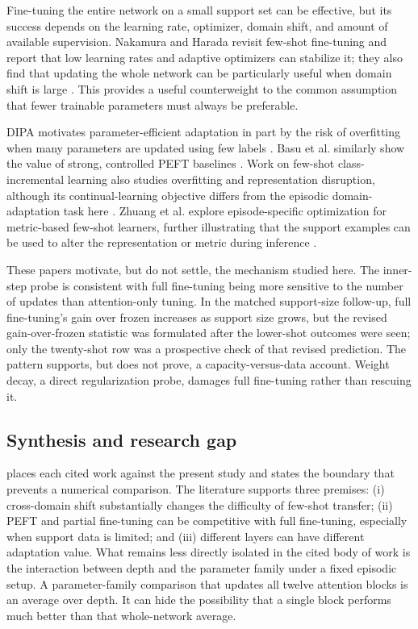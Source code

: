 \documentclass[11pt]{article}
\begin{document}
Fine-tuning the entire network on a small support set can be effective, but its success depends on the learning rate, optimizer, domain shift, and amount of available supervision. Nakamura and Harada revisit few-shot fine-tuning and report that low learning rates and adaptive optimizers can stabilize it; they also find that updating the whole network can be particularly useful when domain shift is large \cite{nakamura2019}. This provides a useful counterweight to the common assumption that fewer trainable parameters must always be preferable.

DIPA motivates parameter-efficient adaptation in part by the risk of overfitting when many parameters are updated using few labels \cite{perera2024}. Basu et al. similarly show the value of strong, controlled PEFT baselines \cite{basu2024}. Work on few-shot class-incremental learning also studies overfitting and representation disruption, although its continual-learning objective differs from the episodic domain-adaptation task here \cite{yang2023}. Zhuang et al. explore episode-specific optimization for metric-based few-shot learners, further illustrating that the support examples can be used to alter the representation or metric during inference \cite{zhuang2025}.

These papers motivate, but do not settle, the mechanism studied here. The inner-step probe is consistent with full fine-tuning being more sensitive to the number of updates than attention-only tuning. In the matched support-size follow-up, full fine-tuning's gain over frozen increases as support size grows, but the revised gain-over-frozen statistic was formulated after the lower-shot outcomes were seen; only the twenty-shot row was a prospective check of that revised prediction. The pattern supports, but does not prove, a capacity-versus-data account. Weight decay, a direct regularization probe, damages full fine-tuning rather than rescuing it.

\subsection{Synthesis and research gap}

 places each cited work against the present study and states the boundary that prevents a numerical comparison. The literature supports three premises: (i) cross-domain shift substantially changes the difficulty of few-shot transfer; (ii) PEFT and partial fine-tuning can be competitive with full fine-tuning, especially when support data is limited; and (iii) different layers can have different adaptation value. What remains less directly isolated in the cited body of work is the interaction between depth and the parameter family under a fixed episodic setup. A parameter-family comparison that updates all twelve attention blocks is an average over depth. It can hide the possibility that a single block performs much better than that whole-network average.
\end{document}
